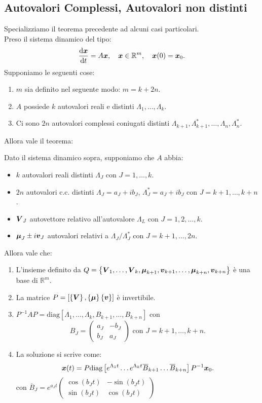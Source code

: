 \subsection{Autovalori Complessi, Autovalori non distinti}%
\label{sub:Autovalori Complessi, Autovalori non distinti}
Specializziamo il teorema precedente ad alcuni casi particolari.\\
Preso il sistema dinamico del tipo:
\[
    \frac{\text{d} \boldsymbol{x}}{\text{d} t} = A\boldsymbol{x}, \quad \boldsymbol{x}\in \mathbb{R}^m, \quad \boldsymbol{x}(0) = \boldsymbol{x}_0
.\] 
Supponiamo le seguenti cose:
\begin{enumerate}
    \item $m$ sia definito nel seguente modo: $m = k + 2n$.
    \item $A$ possiede $k$ autovalori reali e distinti $\Lambda_1, \ldots, \Lambda_k$.
    \item Ci sono $2n$ autovalori complessi coniugati distinti $\Lambda_{k+1}, \Lambda^*_{k+1}, \ldots, \Lambda_n, \Lambda^*_n$.
\end{enumerate}
Allora vale il teorema:
\begin{thm}
    Dato il sistema dinamico sopra, supponiamo che $A$ abbia:
    \begin{itemize}
        \item $k$ autovalori reali distinti $\Lambda_J$ con $J=1, \ldots, k$.
	\item $2n$ autovalori c.c. distinti $\Lambda_J = a_J + ib_J$, $\Lambda^*_J = a_J + ib_J$ con $J = k+1, \ldots, k + n$.
	\item $\boldsymbol{V}_J$ autovettore relativo all'autovalore $\Lambda_L$ con $J = 1, 2, \ldots, k$. 
	\item $\boldsymbol{\mu}_J \pm i \boldsymbol{v}_J$ autovalori relativi a $\Lambda_J/$$\Lambda^*_J$ con $J = k+1, \ldots, 2n$.
    \end{itemize}
    Allora vale che:
    \begin{enumerate}
        \item L'insieme definito da $Q = \left\{\boldsymbol{V}_1, \ldots, \boldsymbol{V}_k, \boldsymbol{\mu}_{k+1}, \boldsymbol{v}_{k+1}, \ldots, \boldsymbol{\mu}_{k + n}, \boldsymbol{v}_{k + n} \right\}$ è una base di $\mathbb{R}^m$.
    \item La matrice $P = \left[\left\{\boldsymbol{V}\right\}, \left\{\boldsymbol{\mu}\right\}\left\{\boldsymbol{v}\right\}\right]$ è invertibile.
    \item  $P^{-1}AP = \text{diag}\left[ \Lambda_1, \ldots, \Lambda_k, B_{k+1}, \ldots, B_{k+n} \right]$ con 
	\[
	    B_J = \begin{pmatrix} a_J & - b_J \\ b_J & a_J \end{pmatrix} \text{ con } J = k+1, \ldots, k+n
	.\] 
    \item La soluzione si scrive come:
	\[
	    \boldsymbol{x}(t) = P\text{diag}\left[e^{\Lambda_1t}\ldots e^{\Lambda_kt} \overline{B}_{k+1}\ldots\overline{B}_{k+n}\right]P^{-1}\boldsymbol{x}_0
	.\] 
	con $\overline{B}_J = e^{a_J t}\begin{pmatrix} \cos (b_Jt) & - \sin (b_Jt) \\ \sin (b_Jt) & \cos (b_Jt)  \end{pmatrix} $ 
    \end{enumerate}
\end{thm}

